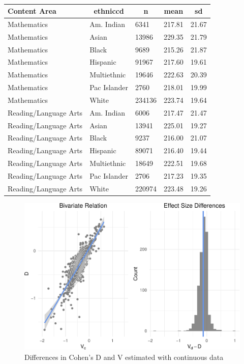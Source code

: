 \documentclass[man, fleqn, noextraspace]{apa6}
\theoremstyle{definition}
\theoremstyle{definition}
\theoremstyle{definition}
\theoremstyle{remark}
\begin{document}
\begin{table}[tbp]
\begin{center}
\begin{threeparttable}
\caption{\label{tab:descrips}}
\begin{tabular}{lllll}
\toprule
Content Area & \multicolumn{1}{c}{ethniccd} & \multicolumn{1}{c}{n} & \multicolumn{1}{c}{mean} & \multicolumn{1}{c}{sd}\\
\midrule
Mathematics & Am. Indian & 6341 & 217.81 & 21.67\\
Mathematics & Asian & 13986 & 229.35 & 21.79\\
Mathematics & Black & 9689 & 215.26 & 21.87\\
Mathematics & Hispanic & 91967 & 217.60 & 19.61\\
Mathematics & Multiethnic & 19646 & 222.63 & 20.39\\
Mathematics & Pac Islander & 2760 & 218.01 & 19.99\\
Mathematics & White & 234136 & 223.74 & 19.64\\
Reading/Language Arts & Am. Indian & 6006 & 217.47 & 21.47\\
Reading/Language Arts & Asian & 13941 & 225.01 & 19.27\\
Reading/Language Arts & Black & 9237 & 216.00 & 21.07\\
Reading/Language Arts & Hispanic & 89071 & 216.40 & 19.44\\
Reading/Language Arts & Multiethnic & 18649 & 222.51 & 19.68\\
Reading/Language Arts & Pac Islander & 2706 & 217.23 & 19.35\\
Reading/Language Arts & White & 220974 & 223.48 & 19.26\\
\bottomrule
\end{tabular}
\end{threeparttable}
\end{center}
\end{table}

\begin{figure}
\centering
\includegraphics{anderson_ncme18_files/figure-latex/unnamed-chunk-1-1.pdf}
\caption{\label{fig:unnamed-chunk-1}Differences in Cohen's D and V estimated
with continuous data}
\end{figure}
\end{document}
